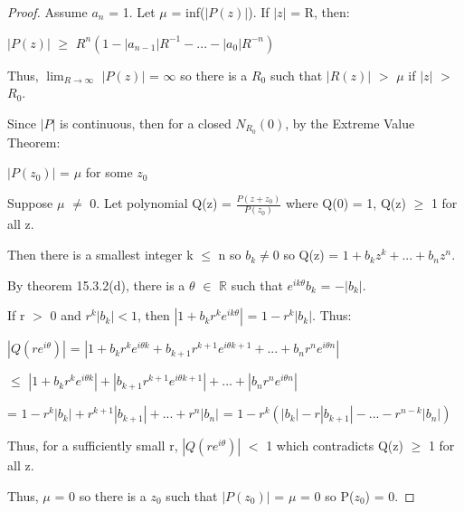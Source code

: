     \begin{proof}
        Assume $a_n$ = 1.
        Let $\mu$ = inf($|P(z)|$). If $|z|$ = R, then:

        \hspace{0.5cm}
        $|P(z)|$
        $\geq$ $R^n(1 - |a_{n-1}|R^{-1} - ... - |a_0|R^{-n})$

        Thus, $\lim_{R \rightarrow \infty}$ $|P(z)|$ = $\infty$
        so there is a $R_0$ such that $|R(z)|$ $>$ $\mu$ if $|z|$ $>$ $R_0$.

        Since $|P|$ is continuous, then for a closed $N_{R_0}(0)$, by the
        Extreme Value Theorem:

        \hspace{0.5cm}
        $|P(z_0)|$ = $\mu$
        \hspace{1cm}
        for some $z_0$

        Suppose $\mu$ $\not =$ 0.
        Let polynomial Q(z) = $\frac{P(z+z_0)}{P(z_0)}$
        where Q(0) = 1, Q(z) $\geq$ 1 for all z.

        Then there is a smallest integer k $\leq$ n so $b_k \not = 0$ so
        Q(z) = $1 + b_kz^k + ... + b_nz^n$.

        By {\color{red} theorem 15.3.2(d)}, there is a $\theta$ $\in$ $\mathbb{R}$
        such that $e^{ik\theta}b_k$ = $-|b_k|$.

        If r $>$ 0  and $r^k|b_k| < 1$, then
        $|1 + b_kr^ke^{ik\theta}|$ = $1-r^k|b_k|$. Thus:

        \hspace{0.5cm}
        $|Q(re^{i\theta})|$
        = $|1 + b_kr^ke^{i\theta k} + b_{k+1}r^{k+1}e^{i\theta {k+1}}
            + ... + b_nr^ne^{i\theta n}|$

        \hspace{2.2cm}
        $\leq$ $|1 + b_kr^ke^{i\theta k}| + |b_{k+1}r^{k+1}e^{i\theta {k+1}}|
                    + ... + |b_nr^ne^{i\theta n}|$

        \hspace{2.2cm}
        = $1 - r^k|b_k| + r^{k+1}|b_{k+1}| + ... + r^n|b_n|$
        = $1 - r^k(|b_k| - r|b_{k+1}| - ... - r^{n-k}|b_n|)$

        Thus, for a sufficiently small r, $|Q(re^{i\theta})|$ $<$ 1
        which contradicts Q(z) $\geq$ 1 for all z.

        Thus, $\mu$ = 0 so there is a $z_0$ such that $|P(z_0)|$ = $\mu$ = 0
        so P($z_0$) = 0.
    \end{proof}

